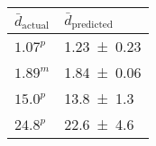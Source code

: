 \documentclass[a4paper,twocolumn,floatfix]{revtex4-1}
\begin{document}
\thispagestyle{empty}
\footnotesize
 \begin{tabularx}{80pt}{XX}
 \toprule
 $\bar{d}_\mathrm{actual}$ & $\bar{d}_\mathrm{predicted}$ \\
 \midrule
  $1.07^p$ & \num{1.23+-0.23} \\
  $1.89^m$ & \num{1.84+-0.06} \\
  $15.0^p$ & \num{13.8+-1.3} \\
  $24.8^p$ & \num{22.6+-4.6} \\
 \bottomrule
\end{tabularx}
\end{document}
